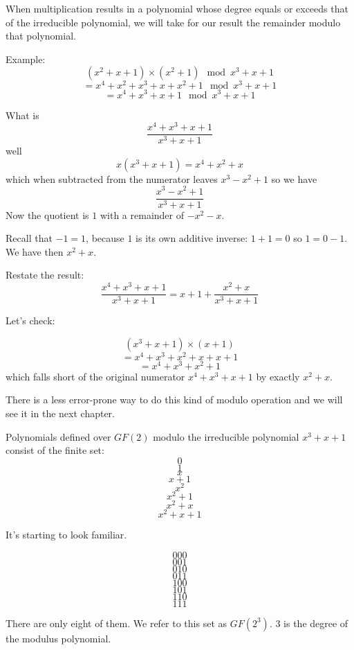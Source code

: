\documentclass[11pt, oneside]{article}
\begin{document}
When multiplication results in a polynomial whose degree equals or exceeds that of the irreducible polynomial, we will take for our result the remainder modulo that polynomial.

Example:
\[ (x^2 + x + 1) \times (x^2 + 1) \mod x^3 + x + 1 \]
\[ = x^4 + x^2 + x^3 + x + x^2 + 1  \mod x^3 + x + 1  \]
\[ = x^4 + x^3 + x  + 1  \mod x^3 +x+1 \]

What is 
\[ \frac{x^4 + x^3 + x  + 1}{x^3 +x+1} \]
well
\[ x (x^3 + x + 1) = x^4 + x^2 + x \]
which when subtracted from the numerator leaves $x^3 - x^2 + 1$ so we have
\[ \frac{x^3 - x^2 + 1}{x^3 +x+1} \]
Now the quotient is $1$ with a remainder of $-x^2 - x$.

Recall that $-1 = 1$, because $1$ is its own additive inverse:  $1 + 1 = 0$ so $1 = 0 - 1$.  We have then $x^2 + x$.

Restate the result:
\[ \frac{x^4 + x^3 + x + 1}{x^3 + x + 1} = x + 1 + \frac{x^2 + x}{x^3 + x + 1} \]

Let's check:

\[ (x^3 +x+1) \times (x + 1) \]
\[ = x^4 + x^3 + x^2 + x + x + 1 \]
\[ = x^4 + x^3 + x^2 + 1 \]
which falls short of the original numerator $x^4 + x^3 + x  + 1$ by exactly $x^2 + x$.

There is a less error-prone way to do this kind of modulo operation and we will see it in the next chapter.

Polynomials defined over $GF(2)$ modulo the irreducible polynomial $x^3 + x + 1$ consist of the finite set:
\[ 0 \]
\[ 1 \]
\[ x \]
\[ x + 1 \]
\[ x^2 \]
\[ x^2 + 1 \]
\[ x^2 + x \]
\[ x^2 + x + 1 \]

It's starting to look familiar.

\[ 000 \]
\[ 001 \]
\[ 010 \]
\[ 011 \]
\[100 \]
\[101 \]
\[110 \]
\[111 \]


There are only eight of them.  We refer to this set as $GF(2^3)$.  3 is the degree of the modulus polynomial.
\end{document}
